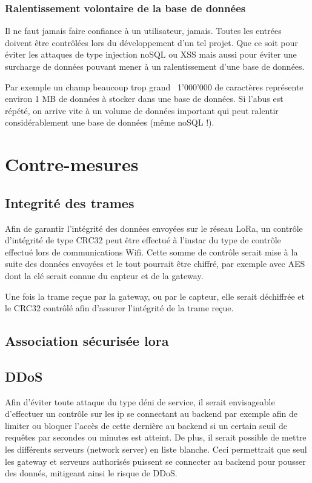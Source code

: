 \documentclass[12pt]{article}
\begin{document}
\subsubsection{Ralentissement volontaire de la base de données}

Il ne faut jamais faire confiance à un utilisateur, jamais. Toutes les entrées doivent être contrôlées lors du développement d'un tel projet. Que ce soit pour éviter les attaques de type injection noSQL ou XSS mais aussi pour éviter une surcharge de données pouvant mener à un ralentissement d'une base de données. 

Par exemple un champ beaucoup trop grand ~1'000'000 de caractères représente environ 1 MB de données à stocker dans une base de données. Si l'abus est répété, on arrive vite à un volume de données important qui peut ralentir considérablement une base de données (même noSQL !). 
\clearpage

\section{Contre-mesures}
\label{sec:contremesures}
\subsection{Integrité des trames}
Afin de garantir l'intégrité des données envoyées sur le réseau LoRa, un contrôle d'intégrité de type CRC32 peut être effectué à l'instar du type de contrôle effectué lors de communications Wifi. Cette somme de contrôle serait mise à la suite des données envoyées et le tout pourrait être chiffré, par exemple avec AES dont la clé serait connue du capteur et de la gateway.

Une fois la trame reçue par la gateway, ou par le capteur, elle serait déchiffrée et le CRC32 contrôlé afin d'assurer l'intégrité de la trame reçue.

\subsection{Association sécurisée lora}

\subsection{DDoS}
Afin d'éviter toute attaque du type déni de service, il serait envisageable d'effectuer un contrôle sur les ip se connectant au backend par exemple afin de limiter ou bloquer l'accès de cette dernière au backend si un certain seuil de requêtes par secondes ou minutes est atteint. De plus, il serait possible de mettre les différents serveurs (network server) en liste blanche. Ceci permettrait que seul les gateway et serveurs authorisés puissent se connecter au backend pour pousser des donnés, mitigeant ainsi le risque de DDoS.
\end{document}
